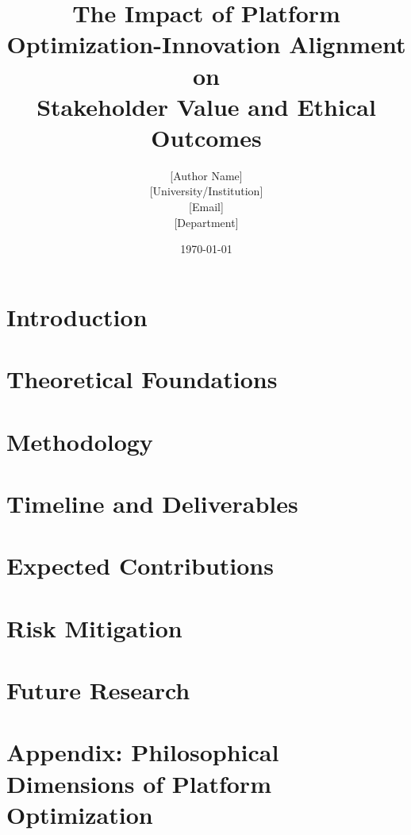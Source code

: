 \documentclass[12pt]{article}
\title{\Large\textbf{The Impact of Platform Optimization-Innovation Alignment on\\Stakeholder Value and Ethical Outcomes}}
\author{[Author Name]\\
        \small{[University/Institution]}\\
        \small{[Email]}\\
        \small{[Department]}
}
\date{\today}
\begin{document}
\maketitle

\begin{abstract}
\noindent

\end{abstract}

\section*{Introduction}


\section*{Theoretical Foundations}


\section*{Methodology}


\section*{Timeline and Deliverables}


\section*{Expected Contributions}


\section*{Risk Mitigation}


\section*{Future Research}


\section*{Appendix: Philosophical Dimensions of Platform Optimization}


\printbibliography[title=References]
\end{document}
